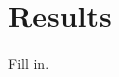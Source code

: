 \documentclass{rspublic}
\begin{document}
\section{Results}
Fill in. 

%
%
%
%
%
%
%
%
\end{document}
